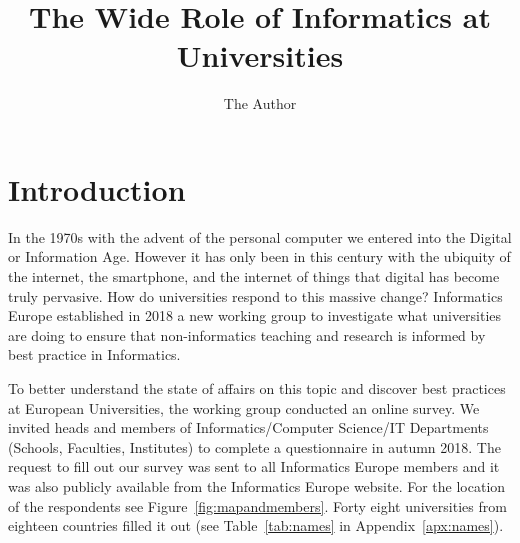 \documentclass[11pt]{amsart}
\title{The Wide Role of Informatics at Universities}
\author{The Author}
\begin{document}
\maketitle
\section{Introduction}

In the 1970s with the advent of the personal computer we entered into the Digital or Information Age. However it has only been in this century with the ubiquity of the internet, the smartphone, and the internet of things that digital has become truly pervasive. How do universities respond to this massive change? Informatics Europe established in 2018 a new working group to investigate what universities are doing to ensure that non-informatics teaching and research is informed by best practice in Informatics.

To better understand the state of affairs on this topic and discover best practices at European Universities, the working group conducted an online survey. We invited heads and members of Informatics/Computer Science/IT Departments (Schools, Faculties, Institutes) to complete a questionnaire in autumn 2018. The request to fill out our survey was sent to all Informatics Europe members and it was also publicly available from the Informatics Europe website.  For the location of the respondents see Figure~\ref{fig:mapandmembers}.  Forty eight universities from eighteen countries filled it out (see Table~\ref{tab:names} in Appendix~\ref{apx:names}).
\end{document}
